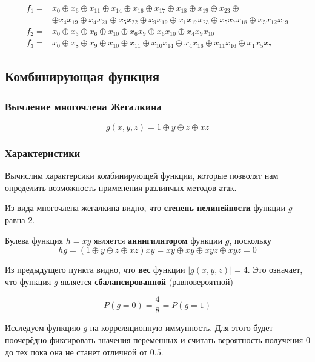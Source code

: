 \documentclass[a4paper,12pt]{article}
\theoremstyle{definition}
\begin{document}
	\begin{align*}
		f_1 =& x_0 \oplus x_6 \oplus x_{11} \oplus x_{14} \oplus x_{16} \oplus x_{17} \oplus x_{18} \oplus x_{19} \oplus x_{23} \oplus\\
			 &\oplus x_{4} x_{19} \oplus x_{4} x_{21} \oplus x_5 x_{22} \oplus x_9 x_{19} \oplus x_1 x_{17} x_23 \oplus x_5 x_7 x_{18} \oplus x_5 x_{12} x_{19} \\[2ex]
		f_2 =& x_0 \oplus x_3 \oplus x_6 \oplus x_{10} \oplus x_6 x_9 \oplus x_6 x_{10} \oplus x_4 x_9 x_{10} \\[2ex]
		f_3 =& x_0 \oplus x_8 \oplus x_9 \oplus x_{10} \oplus x_{11} \oplus x_{10} x_{14} \oplus x_4 x_{16}\oplus x_{11} x_{16} \oplus x_1 x_5 x_7 
	\end{align*}
	
	\subsection{Комбинирующая функция}
	
	\subsubsection{Вычление многочлена Жегалкина}
		
	\[ g(x,y,z) = 1 \oplus y \oplus z \oplus x z\]

	\subsubsection{Характеристики}
	
	Вычислим характерсики комбинирующей функции, которые позволят нам определить возможность применения разлинчых методов атак.
	
	Из вида многочлена жегалкина видно, что \textbf{степень нелинейности} функции $g$ равна 2. 
	
	Булева функция $h = x y$ является \textbf{аннигилятором} функции $g$, поскольку
	\[ h g = \left(1 \oplus y \oplus z \oplus x z \right) xy = xy \oplus xy \oplus xyz \oplus xyz = 0 \]

	Из предыдущего пункта видно, что \textbf{вес} функции $|g(x,y,z)| = 4$. Это означает, что функция $g$ является \textbf{сбалансированной} (равновероятной)
	
	\[ P(g = 0) = \frac{4}{8} = P(g = 1) \]

	Исследуем функцию $g$ на корреляционную иммунность. Для этого будет поочерёдно фиксировать значения переменных и считать вероятность получения $0$ до тех пока она не станет отличной от $0.5$.
	
\end{document}
